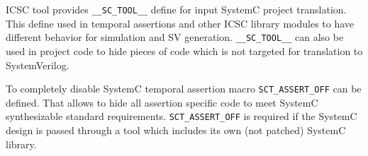 ICSC tool provides {\tt \_\_SC\_TOOL\_\_} define for input SystemC project translation. This define used in temporal assertions and other ICSC library modules to have different behavior for simulation and SV generation. {\tt \_\_SC\_TOOL\_\_} can also be used in project code to hide pieces of code which is not targeted for translation to SystemVerilog.

To completely disable SystemC temporal assertion macro {\tt SCT\_ASSERT\_OFF} can be defined. That allows to hide all assertion specific code to meet SystemC synthesizable standard requirements. {\tt SCT\_ASSERT\_OFF} is required if the SystemC design is passed through a tool which includes its own (not patched) SystemC library.


